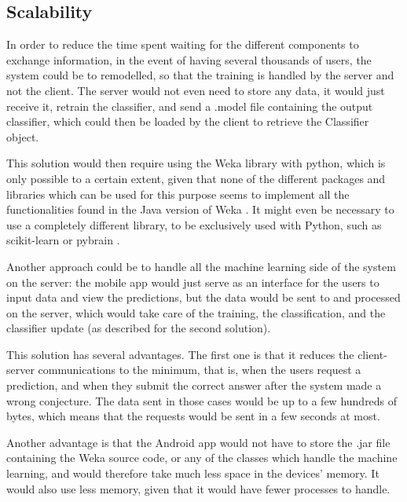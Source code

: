 \documentclass{mproj}
\begin{document}
\subsection{Scalability}

In order to reduce the time spent waiting for the different components to exchange information, in the event of having several thousands of users, the system could be to remodelled, so that the training is handled by the server and not the client. The server would not even need to store any data, it would just receive it, retrain the classifier, and send a .model file containing the output classifier, which could then be loaded by the client to retrieve the Classifier object. \par

This solution would then require using the Weka library with python, which is only possible to a certain extent, given that none of the different packages and libraries which can be used for this purpose seems to implement all the functionalities found in the Java version of Weka \cite{wekapython}. It might even be necessary to use a completely different library, to be exclusively used with Python, such as scikit-learn \cite{scikit-learn} or pybrain \cite{pybrain}. \par

Another approach could be to handle all the machine learning side of the system on the server: the mobile app would just serve as an interface for the users to input data and view the predictions, but the data would be sent to and processed on the server, which would take care of the training, the classification, and the classifier update (as described for the second solution). \par

This solution has several advantages. The first one is that it reduces the client-server communications to the minimum, that is, when the users request a prediction, and when they submit the correct answer after the system made a wrong conjecture. The data sent in those cases would be up to a few hundreds of bytes, which means that the requests would be sent in a few seconds at most. \par

Another advantage is that the Android app would not have to store the .jar file containing the Weka source code, or any of the classes which handle the machine learning, and would therefore take much less space in the devices' memory. It would also use less memory, given that it would have fewer processes to handle. \par
\end{document}
